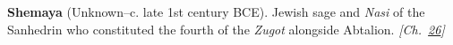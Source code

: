 \textbf{Shemaya} (Unknown–c. late 1st century BCE). Jewish sage and \emph{Nasi} of the Sanhedrin who constituted the fourth of the \emph{Zugot} alongside Abtalion. \emph{[Ch.~\hyperref[ch:jewishcalendar]{26}]}

